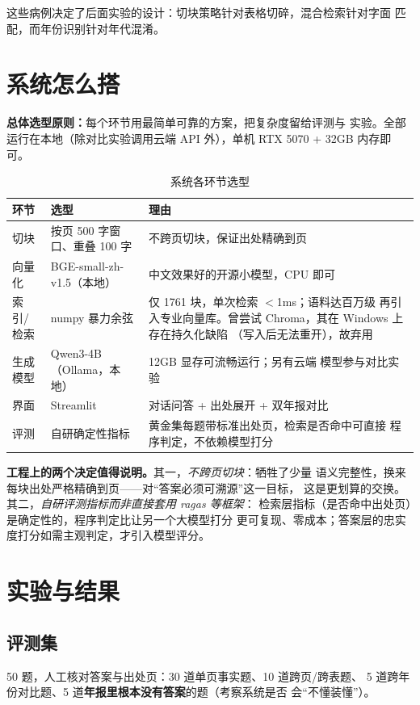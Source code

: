 \documentclass[UTF8,11pt]{ctexart}
\begin{document}
这些病例决定了后面实验的设计：切块策略针对表格切碎，混合检索针对字面
匹配，而年份识别针对年代混淆。

\section{系统怎么搭}

\textbf{总体选型原则：}每个环节用最简单可靠的方案，把复杂度留给评测与
实验。全部运行在本地（除对比实验调用云端 API 外），单机 RTX 5070 +
32GB 内存即可。

\begin{table}[H]
\centering
\begin{tabular}{llp{7.2cm}}
\toprule
环节 & 选型 & 理由 \\
\midrule
切块 & 按页 500 字窗口、重叠 100 字 & 不跨页切块，保证出处精确到页 \\
向量化 & BGE-small-zh-v1.5（本地） & 中文效果好的开源小模型，CPU 即可 \\
索引/检索 & numpy 暴力余弦 & 仅 1761 块，单次检索 $<$1ms；语料达百万级
再引入专业向量库。曾尝试 Chroma，其在 Windows 上存在持久化缺陷
（写入后无法重开），故弃用 \\
生成模型 & Qwen3-4B（Ollama，本地） & 12GB 显存可流畅运行；另有云端
模型参与对比实验 \\
界面 & Streamlit & 对话问答 + 出处展开 + 双年报对比 \\
评测 & 自研确定性指标 & 黄金集每题带标准出处页，检索是否命中可直接
程序判定，不依赖模型打分 \\
\bottomrule
\end{tabular}
\caption{系统各环节选型}
\end{table}

\textbf{工程上的两个决定值得说明。}其一，\emph{不跨页切块}：牺牲了少量
语义完整性，换来每块出处严格精确到页——对``答案必须可溯源''这一目标，
这是更划算的交换。其二，\emph{自研评测指标而非直接套用 ragas 等框架}：
检索层指标（是否命中出处页）是确定性的，程序判定比让另一个大模型打分
更可复现、零成本；答案层的忠实度打分如需主观判定，才引入模型评分。

\section{实验与结果}

\subsection{评测集}

50 题，人工核对答案与出处页：30 道单页事实题、10 道跨页/跨表题、
5 道跨年份对比题、5 道\textbf{年报里根本没有答案}的题（考察系统是否
会``不懂装懂''）。
\end{document}
